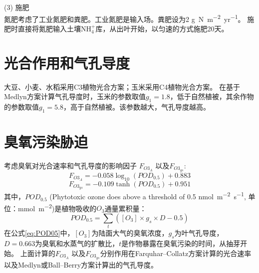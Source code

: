 (3) 施肥\\
氮肥考虑了工业氮肥和粪肥。工业氮肥是输入场。粪肥设为2 \unit{g.N.m^{-2}.yr^{-1}}。
施肥时直接将氮肥输入土壤$\mathrm{NH_4^{+}}$库，从出叶开始，以匀速的方式施肥20天。


\section{光合作用和气孔导度}
大豆、小麦、水稻采用C3植物光合方案；玉米采用C4植物光合方案。
在基于Medlyn方案计算气孔导度时，玉米的参数取值$g_1=1.8$，低于自然植被，其余作物的参数取值$g_1=5.8$，高于自然植被。该参数越大，气孔导度越高。


\section{臭氧污染胁迫}
考虑臭氧对光合速率和气孔导度的影响因子 $F_{O3_A}$ 以及$F_{O3_{gs}}$:
\begin{equation}
F_{O3_{A}}=-0.058 \log _{10}\left(POD_{0.5}\right)+0.883
\end{equation}
\begin{equation}
F_{O3_{gs}}=-0.109 \tanh \left(POD_{0.5}\right)+0.951
\end{equation}
其中，$POD_{0.5}$ (Phytotoxic ozone does above a threshold of 0.5 \unit{nmol.m^{-2}.s^{-1}}, 单位：\unit{mmol.m^{-2}})是植物吸收的$O_3$通量累积量：
\begin{equation}\label{eq:POD05}
POD_{0.5}=\sum_{t}\left(\left[{O}_{3}\right] \times g_{s} \times D-0.5\right)
\end{equation}
在公式\eqref{eq:POD05}中，$\left[{O}_{3}\right]$为陆面大气的臭氧浓度，$g_{s}$为叶气孔导度，
$D=0.663$为臭氧和水蒸气的扩散比，$t$是作物暴露在臭氧污染的时间，从抽芽开始。
上面计算的$F_{{O3}_A}$ 以及$F_{O3_{gs}}$分别作用在Farquhar--Collatz方案计算的光合速率以及Medlyn或Ball--Berry方案计算出的气孔导度。


